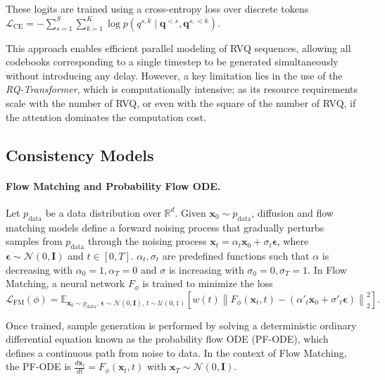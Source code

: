 These logits are trained using a cross-entropy loss over discrete tokens $\mathcal{L}_{\text{CE}} = -\sum_{s=1}^S\sum_{k=1}^K \log p \left(q^{s,k} \mid \mathbf{q}^{<s}, \mathbf{q}^{s, <k} \right).$

This approach enables efficient parallel modeling of RVQ sequences, allowing all codebooks corresponding to a single timestep to be generated simultaneously without introducing any delay. However, a key limitation lies in the use of the \textit{RQ-Transformer}, which is computationally intensive;  as its resource requirements scale with the number of RVQ, or even with the square of the number of RVQ, if the attention dominates the computation cost.

\subsection{Consistency Models}
\paragraph{Flow Matching and Probability Flow ODE.} 
Let $p_{\text{data}}$ be a data distribution over  $\mathbb{R}^d$. Given $\mathbf{x}_0 \sim p_{\text{data}}$, diffusion \citep{diffusion_ddpm, diffusion_sde} and flow matching \citep{flowmatching} models define a forward noising process that gradually perturbs samples from $p_{\text{data}}$ through the noising process $\mathbf{x}_t = \alpha_t \mathbf{x}_0 + \sigma_t \bm{\epsilon}$, where $\bm{\epsilon} \sim \mathcal{N}(0, \mathbf{I})$ and $t \in [0, T]$. $\alpha_t, \sigma_t$ are predefined functions such that $\alpha$ is decreasing with $\alpha_0=1, \alpha_T=0$ and $\sigma$ is increasing with $\sigma_0=0, \sigma_T=1$.
In Flow Matching, a neural network $F_\phi$ is trained to minimize the loss $\mathcal{L}_{\text{FM}}(\phi) = \mathbb{E}_{\mathbf{x}_0 \sim p_{\text{data}},\, \bm{\epsilon} \sim \mathcal{N}(0, \mathbf{I}),\, t \sim \mathcal{U}(0, 1)} 
\left[ w(t) \left\| F_\phi(\mathbf{x}_t, t) - \left( \alpha'_t \mathbf{x}_0 + \sigma'_t \bm{\epsilon} \right) \right\|_2^2 \right].
$

Once trained, sample generation is performed by solving a deterministic ordinary differential equation known as the probability flow ODE (PF-ODE), which defines a continuous path from noise to data. In the context of Flow Matching, the PF-ODE is $\frac{d\mathbf{x}_t}{dt} = F_\phi(\mathbf{x}_t, t)$ with $\mathbf{x}_T \sim \mathcal{N}(0, \mathbf{I})$. 

